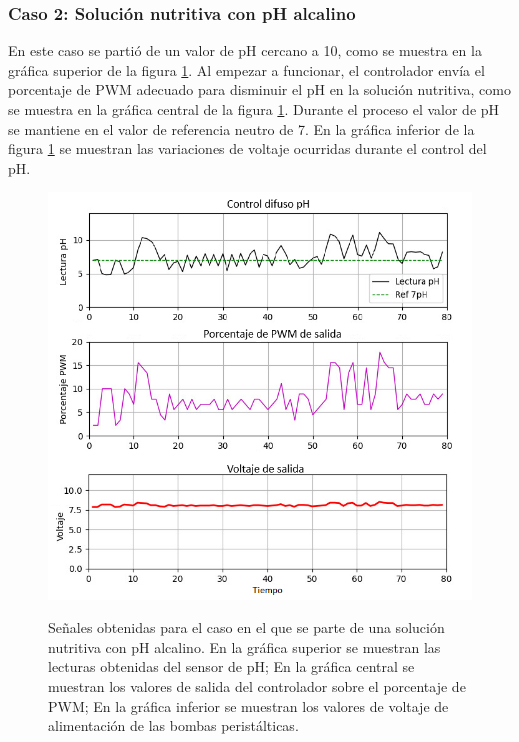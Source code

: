 \subsubsection{Caso 2: Solución nutritiva con pH alcalino}

En este caso se partió de un valor de pH cercano a 10, como se muestra en la gráfica superior de la figura \ref{PHMas}. Al empezar a funcionar, el controlador envía el porcentaje de PWM adecuado para disminuir el pH en la solución nutritiva, como se muestra en la gráfica central de la figura \ref{PHMas}. Durante el proceso el valor de pH se mantiene en el valor de referencia neutro de 7. En la gráfica inferior de la figura \ref{PHMas} se muestran las variaciones de voltaje ocurridas durante el control del pH.
\begin{figure}[H]
\centering
         \includegraphics[scale=0.85]{imgs/phMas.png} \\
    \caption{Señales obtenidas para el caso en el que se parte de una solución nutritiva con pH alcalino. En la gráfica superior se muestran las lecturas obtenidas del sensor de pH; En la gráfica central se muestran los valores de salida del controlador sobre el porcentaje de PWM; En la gráfica inferior se muestran los valores de voltaje de alimentación de las bombas peristálticas.}\label{PHMas}
\end{figure}
